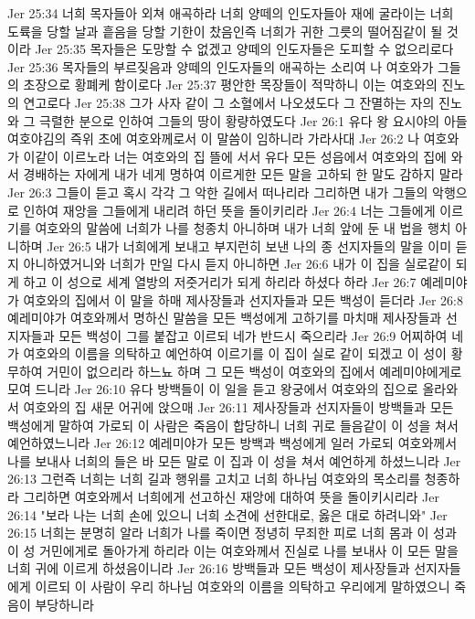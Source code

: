 Jer 25:34  너희 목자들아 외쳐 애곡하라 너희 양떼의 인도자들아 재에 굴라이는 너희 도륙을 당할 날과 흩음을 당할 기한이 찼음인즉 너희가 귀한 그릇의 떨어짐같이 될 것이라
Jer 25:35  목자들은 도망할 수 없겠고 양떼의 인도자들은 도피할 수 없으리로다
Jer 25:36  목자들의 부르짖음과 양떼의 인도자들의 애곡하는 소리여 나 여호와가 그들의 초장으로 황폐케 함이로다
Jer 25:37  평안한 목장들이 적막하니 이는 여호와의 진노의 연고로다
Jer 25:38  그가 사자 같이 그 소혈에서 나오셨도다 그 잔멸하는 자의 진노와 그 극렬한 분으로 인하여 그들의 땅이 황량하였도다
Jer 26:1  유다 왕 요시야의 아들 여호야김의 즉위 초에 여호와께로서 이 말씀이 임하니라 가라사대
Jer 26:2  나 여호와가 이같이 이르노라 너는 여호와의 집 뜰에 서서 유다 모든 성읍에서 여호와의 집에 와서 경배하는 자에게 내가 네게 명하여 이르게한 모든 말을 고하되 한 말도 감하지 말라
Jer 26:3  그들이 듣고 혹시 각각 그 악한 길에서 떠나리라 그리하면 내가 그들의 악행으로 인하여 재앙을 그들에게 내리려 하던 뜻을 돌이키리라
Jer 26:4  너는 그들에게 이르기를 여호와의 말씀에 너희가 나를 청종치 아니하며 내가 너희 앞에 둔 내 법을 행치 아니하며
Jer 26:5  내가 너희에게 보내고 부지런히 보낸 나의 종 선지자들의 말을 이미 듣지 아니하였거니와 너희가 만일 다시 듣지 아니하면
Jer 26:6  내가 이 집을 실로같이 되게 하고 이 성으로 세계 열방의 저줏거리가 되게 하리라 하셨다 하라
Jer 26:7  예레미야가 여호와의 집에서 이 말을 하매 제사장들과 선지자들과 모든 백성이 듣더라
Jer 26:8  예레미야가 여호와께서 명하신 말씀을 모든 백성에게 고하기를 마치매 제사장들과 선지자들과 모든 백성이 그를 붙잡고 이르되 네가 반드시 죽으리라
Jer 26:9  어찌하여 네가 여호와의 이름을 의탁하고 예언하여 이르기를 이 집이 실로 같이 되겠고 이 성이 황무하여 거민이 없으리라 하느뇨 하며 그 모든 백성이 여호와의 집에서 예레미야에게로 모여 드니라
Jer 26:10  유다 방백들이 이 일을 듣고 왕궁에서 여호와의 집으로 올라와서 여호와의 집 새문 어귀에 앉으매
Jer 26:11  제사장들과 선지자들이 방백들과 모든 백성에게 말하여 가로되 이 사람은 죽음이 합당하니 너희 귀로 들음같이 이 성을 쳐서 예언하였느니라
Jer 26:12  예레미야가 모든 방백과 백성에게 일러 가로되 여호와께서 나를 보내사 너희의 들은 바 모든 말로 이 집과 이 성을 쳐서 예언하게 하셨느니라
Jer 26:13  그런즉 너희는 너희 길과 행위를 고치고 너희 하나님 여호와의 목소리를 청종하라 그리하면 여호와께서 너희에게 선고하신 재앙에 대하여 뜻을 돌이키시리라
Jer 26:14  "보라 나는 너희 손에 있으니 너희 소견에 선한대로, 옳은 대로 하려니와"
Jer 26:15  너희는 분명히 알라 너희가 나를 죽이면 정녕히 무죄한 피로 너희 몸과 이 성과 이 성 거민에게로 돌아가게 하리라 이는 여호와께서 진실로 나를 보내사 이 모든 말을 너희 귀에 이르게 하셨음이니라
Jer 26:16  방백들과 모든 백성이 제사장들과 선지자들에게 이르되 이 사람이 우리 하나님 여호와의 이름을 의탁하고 우리에게 말하였으니 죽음이 부당하니라
